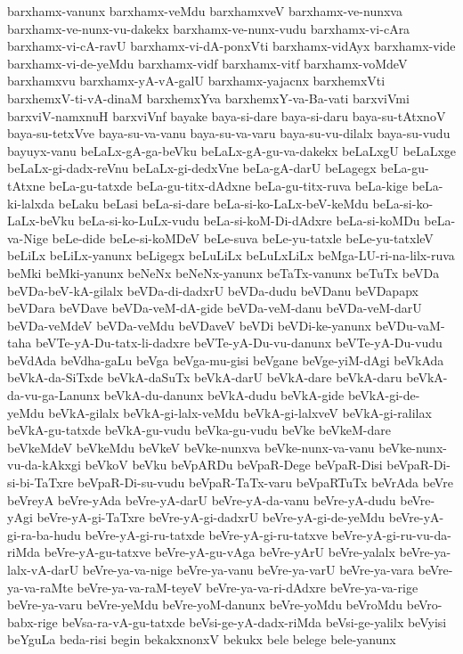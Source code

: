 {barxhamx-vanunx
barxhamx-veMdu
barxhamxveV
barxhamx-ve-nunxva
barxhamx-ve-nunx-vu-dakekx
barxhamx-ve-nunx-vudu
barxhamx-vi-cAra
barxhamx-vi-cA-ravU
barxhamx-vi-dA-ponxVti
barxhamx-vidAyx
barxhamx-vide
barxhamx-vi-de-yeMdu
barxhamx-vidf
barxhamx-vitf
barxhamx-voMdeV
barxhamxvu
barxhamx-yA-vA-galU
barxhamx-yajacnx
barxhemxVti
barxhemxV-ti-vA-dinaM
barxhemxYva
barxhemxY-va-Ba-vati
barxviVmi
barxviV-namxnuH
barxviVnf
bayake
baya-si-dare
baya-si-daru
baya-su-tAtxnoV
baya-su-tetxVve
baya-su-va-vanu
baya-su-va-varu
baya-su-vu-dilalx
baya-su-vudu
bayuyx-vanu
beLaLx-gA-ga-beVku
beLaLx-gA-gu-va-dakekx
beLaLxgU
beLaLxge
beLaLx-gi-dadx-reVnu
beLaLx-gi-dedxVne
beLa-gA-darU
beLagegx
beLa-gu-tAtxne
beLa-gu-tatxde
beLa-gu-titx-dAdxne
beLa-gu-titx-ruva
beLa-kige
beLa-ki-lalxda
beLaku
beLasi
beLa-si-dare
beLa-si-ko-LaLx-beV-keMdu
beLa-si-ko-LaLx-beVku
beLa-si-ko-LuLx-vudu
beLa-si-koM-Di-dAdxre
beLa-si-koMDu
beLa-va-Nige
beLe-dide
beLe-si-koMDeV
beLe-suva
beLe-yu-tatxle
beLe-yu-tatxleV
beLiLx
beLiLx-yanunx
beLigegx
beLuLiLx
beLuLxLiLx
beMga-LU-ri-na-lilx-ruva
beMki
beMki-yanunx
beNeNx
beNeNx-yanunx
beTaTx-vanunx
beTuTx
beVDa
beVDa-beV-kA-gilalx
beVDa-di-dadxrU
beVDa-dudu
beVDanu
beVDapapx
beVDara
beVDave
beVDa-veM-dA-gide
beVDa-veM-danu
beVDa-veM-darU
beVDa-veMdeV
beVDa-veMdu
beVDaveV
beVDi
beVDi-ke-yanunx
beVDu-vaM-taha
beVTe-yA-Du-tatx-li-dadxre
beVTe-yA-Du-vu-danunx
beVTe-yA-Du-vudu
beVdAda
beVdha-gaLu
beVga
beVga-mu-gisi
beVgane
beVge-yiM-dAgi
beVkAda
beVkA-da-SiTxde
beVkA-daSuTx
beVkA-darU
beVkA-dare
beVkA-daru
beVkA-da-vu-ga-Lanunx
beVkA-du-danunx
beVkA-dudu
beVkA-gide
beVkA-gi-de-yeMdu
beVkA-gilalx
beVkA-gi-lalx-veMdu
beVkA-gi-lalxveV
beVkA-gi-ralilax
beVkA-gu-tatxde
beVkA-gu-vudu
beVka-gu-vudu
beVke
beVkeM-dare
beVkeMdeV
beVkeMdu
beVkeV
beVke-nunxva
beVke-nunx-va-vanu
beVke-nunx-vu-da-kAkxgi
beVkoV
beVku
beVpARDu
beVpaR-Dege
beVpaR-Disi
beVpaR-Di-si-bi-TaTxre
beVpaR-Di-su-vudu
beVpaR-TaTx-varu
beVpaRTuTx
beVrAda
beVre
beVreyA
beVre-yAda
beVre-yA-darU
beVre-yA-da-vanu
beVre-yA-dudu
beVre-yAgi
beVre-yA-gi-TaTxre
beVre-yA-gi-dadxrU
beVre-yA-gi-de-yeMdu
beVre-yA-gi-ra-ba-hudu
beVre-yA-gi-ru-tatxde
beVre-yA-gi-ru-tatxve
beVre-yA-gi-ru-vu-da-riMda
beVre-yA-gu-tatxve
beVre-yA-gu-vAga
beVre-yArU
beVre-yalalx
beVre-ya-lalx-vA-darU
beVre-ya-va-nige
beVre-ya-vanu
beVre-ya-varU
beVre-ya-vara
beVre-ya-va-raMte
beVre-ya-va-raM-teyeV
beVre-ya-va-ri-dAdxre
beVre-ya-va-rige
beVre-ya-varu
beVre-yeMdu
beVre-yoM-danunx
beVre-yoMdu
beVroMdu
beVro-babx-rige
beVsa-ra-vA-gu-tatxde
beVsi-ge-yA-dadx-riMda
beVsi-ge-yalilx
beVyisi
beYguLa
beda-risi
begin
bekakxnonxV
bekukx
bele
belege
bele-yanunx
}
